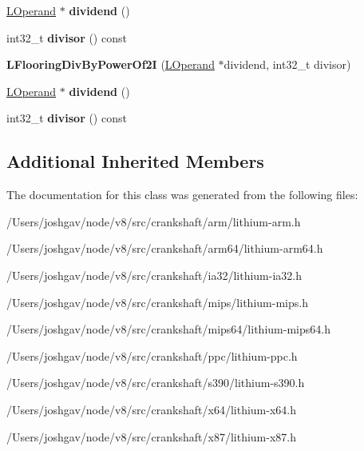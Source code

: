 \begin{DoxyCompactItemize}
\item 
\hyperlink{classv8_1_1internal_1_1_l_operand}{L\+Operand} $\ast$ {\bfseries dividend} ()\hypertarget{classv8_1_1internal_1_1_l_flooring_div_by_power_of2_i_aee291ceb584b7a64ac7eaa1031c2a8cc}{}\label{classv8_1_1internal_1_1_l_flooring_div_by_power_of2_i_aee291ceb584b7a64ac7eaa1031c2a8cc}

\item 
int32\+\_\+t {\bfseries divisor} () const \hypertarget{classv8_1_1internal_1_1_l_flooring_div_by_power_of2_i_a648d12a68de8a628313a5b7cc1c3fbeb}{}\label{classv8_1_1internal_1_1_l_flooring_div_by_power_of2_i_a648d12a68de8a628313a5b7cc1c3fbeb}

\item 
{\bfseries L\+Flooring\+Div\+By\+Power\+Of2I} (\hyperlink{classv8_1_1internal_1_1_l_operand}{L\+Operand} $\ast$dividend, int32\+\_\+t divisor)\hypertarget{classv8_1_1internal_1_1_l_flooring_div_by_power_of2_i_a1dd3730a11d9841227cfb9e917532a0d}{}\label{classv8_1_1internal_1_1_l_flooring_div_by_power_of2_i_a1dd3730a11d9841227cfb9e917532a0d}

\item 
\hyperlink{classv8_1_1internal_1_1_l_operand}{L\+Operand} $\ast$ {\bfseries dividend} ()\hypertarget{classv8_1_1internal_1_1_l_flooring_div_by_power_of2_i_aee291ceb584b7a64ac7eaa1031c2a8cc}{}\label{classv8_1_1internal_1_1_l_flooring_div_by_power_of2_i_aee291ceb584b7a64ac7eaa1031c2a8cc}

\item 
int32\+\_\+t {\bfseries divisor} () const \hypertarget{classv8_1_1internal_1_1_l_flooring_div_by_power_of2_i_a648d12a68de8a628313a5b7cc1c3fbeb}{}\label{classv8_1_1internal_1_1_l_flooring_div_by_power_of2_i_a648d12a68de8a628313a5b7cc1c3fbeb}

\end{DoxyCompactItemize}
\subsection*{Additional Inherited Members}


The documentation for this class was generated from the following files\+:\begin{DoxyCompactItemize}
\item 
/\+Users/joshgav/node/v8/src/crankshaft/arm/lithium-\/arm.\+h\item 
/\+Users/joshgav/node/v8/src/crankshaft/arm64/lithium-\/arm64.\+h\item 
/\+Users/joshgav/node/v8/src/crankshaft/ia32/lithium-\/ia32.\+h\item 
/\+Users/joshgav/node/v8/src/crankshaft/mips/lithium-\/mips.\+h\item 
/\+Users/joshgav/node/v8/src/crankshaft/mips64/lithium-\/mips64.\+h\item 
/\+Users/joshgav/node/v8/src/crankshaft/ppc/lithium-\/ppc.\+h\item 
/\+Users/joshgav/node/v8/src/crankshaft/s390/lithium-\/s390.\+h\item 
/\+Users/joshgav/node/v8/src/crankshaft/x64/lithium-\/x64.\+h\item 
/\+Users/joshgav/node/v8/src/crankshaft/x87/lithium-\/x87.\+h\end{DoxyCompactItemize}
